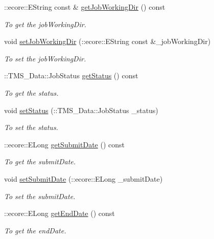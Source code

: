 \begin{DoxyCompactItemize}
::ecore::EString const \& \hyperlink{classTMS__Data_1_1Job_ae677d6ce6039d95f365ec1c35065fdb4}{getJobWorkingDir} () const 
\begin{DoxyCompactList}\small\item\em To get the jobWorkingDir. \item\end{DoxyCompactList}\item 
void \hyperlink{classTMS__Data_1_1Job_ad44d3ee0f37cb59e698e7943d1ad98ab}{setJobWorkingDir} (::ecore::EString const \&\_\-jobWorkingDir)
\begin{DoxyCompactList}\small\item\em To set the jobWorkingDir. \item\end{DoxyCompactList}\item 
::TMS\_\-Data::JobStatus \hyperlink{classTMS__Data_1_1Job_ae56c12cd1054bb9ae14f65fbba8362af}{getStatus} () const 
\begin{DoxyCompactList}\small\item\em To get the status. \item\end{DoxyCompactList}\item 
void \hyperlink{classTMS__Data_1_1Job_a447a7757f473f32f7c2ee29ef9caf0f5}{setStatus} (::TMS\_\-Data::JobStatus \_\-status)
\begin{DoxyCompactList}\small\item\em To set the status. \item\end{DoxyCompactList}\item 
::ecore::ELong \hyperlink{classTMS__Data_1_1Job_a4b4efc695b51033bdcc1f4135379ad4b}{getSubmitDate} () const 
\begin{DoxyCompactList}\small\item\em To get the submitDate. \item\end{DoxyCompactList}\item 
void \hyperlink{classTMS__Data_1_1Job_ae304e81130e89ec9b6ee18dd3e3f613c}{setSubmitDate} (::ecore::ELong \_\-submitDate)
\begin{DoxyCompactList}\small\item\em To set the submitDate. \item\end{DoxyCompactList}\item 
::ecore::ELong \hyperlink{classTMS__Data_1_1Job_a73beec335015e4f904b1927bf08f3912}{getEndDate} () const 
\begin{DoxyCompactList}\small\item\em To get the endDate. \item\end{DoxyCompactList}\item 

\end{DoxyCompactItemize}
